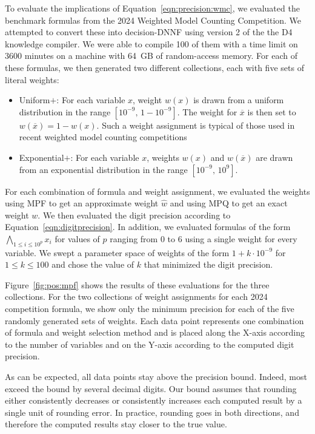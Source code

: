 \documentclass[letterpaper,USenglish,cleveref, autoref, thm-restate]{lipics-v2021}
\newcommand{\obar}[1]{\overline{#1}}
\newcommand{\approximate}[1]{\hat{#1}}
\newcommand{\approxw}{\approximate{w}}
\begin{document}
To evaluate the implications of Equation~\ref{eqn:precision:wmc}, we
evaluated the benchmark formulas from the 2024 Weighted Model Counting
Competition.  We attempted to convert these into decision-DNNF using
version 2 of the the D4 knowledge compiler.  We were able to compile
100 of them with a time limit on 3600 minutes on a machine with 64~GB
of random-access memory.  For each of these formulas, we then generated two different collections, each with five sets of literal weights:
\begin{itemize}
\item \textsf{Uniform$+$}: For each variable $x$, weight $w(x)$
  is drawn from a uniform distribution in the range
  $[10^{-9},\,1-10^{-9}]$. The weight for $\obar{x}$ is then set to
  $w(\obar{x}) = 1-w(x)$.  Such a weight assignment is typical of those used in recent weighted model counting competitions
\item \textsf{Exponential$+$}: For each variable $x$, weights $w(x)$ and $w(\obar{x})$
  are drawn from an exponential distribution in the range
  $[10^{-9},\,10^{9}]$.
\end{itemize}
For each combination of formula and weight assignment, we evaluated
the weights using MPF to get an approximate weight $\approxw$ and
using MPQ to get an exact weight $w$.  We then evaluated the digit precision according to Equation~\ref{eqn:digitprecision}.
In addition, we evaluated formulas of the form $\bigwedge_{1\leq i \leq 10^p} x_i$ for values of $p$ ranging from $0$ to $6$ using a single weight for every variable.
We swept a parameter space of weights of the form $1 + k\cdot 10^{-9}$ for $1 \leq k \leq 100$ and chose the value of $k$ that minimized the digit precision.

Figure~\ref{fig:pos:mpf} shows the results of these evaluations for
the three collections.  For the two collections of weight assignments for each 2024 competition formula,
we show only the minimum precision for each of the five randomly
generated sets of weights.  Each data point
represents one combination of formula and weight selection method and is placed
along the X-axis according to the number of variables
and on the Y-axis according to the computed digit precision.

As can
be expected, all data points stay above the precision bound.  Indeed,
most exceed the bound by several decimal digits.  Our bound assumes
that rounding either consistently decreases or consistently
increases each computed result by a single unit of rounding error.  In
practice, rounding goes in both directions, and
therefore the computed results stay closer to the true value.
\end{document}
